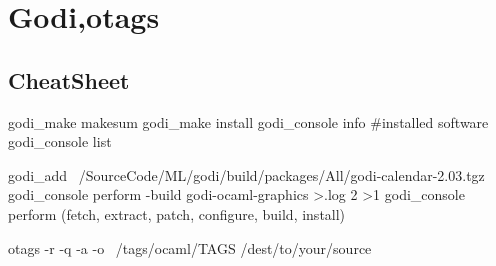 
\section{Godi,otags}
\label{sec:godi}
\subsection{CheatSheet}



\begin{bashcode}
godi_make makesum
godi_make  install
godi_console info #installed software
godi_console list

godi_add ~/SourceCode/ML/godi/build/packages/All/godi-calendar-2.03.tgz
godi_console perform -build godi-ocaml-graphics  >.log 2 >1
godi_console perform (fetch, extract, patch, configure, build, install)
\end{bashcode}

\begin{bashcode}
otags -r -q -a -o ~/tags/ocaml/TAGS /dest/to/your/source  
\end{bashcode}


